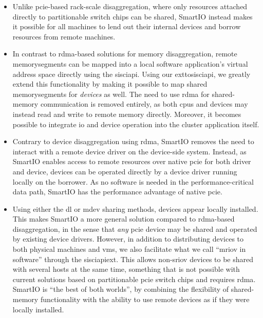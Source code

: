 \begin{itemize}
    \item Unlike \gls{pcie}-based rack-scale \gls{disaggregation}, where only resources attached directly to partitionable switch chips can be shared, SmartIO instead makes it possible for all machines to lend out their internal devices and borrow resources from remote machines.



    \item In contrast to \gls{rdma}-based solutions for memory \gls{disaggregation}, remote \glspl{memorysegment} can be mapped into a local software application's virtual address space directly using the \gls{sisciapi}.
        Using our \gls{exttosisciapi}, we greatly extend this functionality by making it possible to map shared \glspl{memorysegment} for \emph{devices} as well.
        The need to use \gls{rdma} for shared-memory communication is removed entirely, as both \glspl{cpu} and devices may instead read and write to remote memory directly.
        Moreover, it becomes possible to integrate \gls{io} and device operation into the cluster application itself.



    \item Contrary to device \gls{disaggregation} using \gls{rdma}, SmartIO removes the need to interact with a remote device driver on the device-side system.
        Instead, as SmartIO enables access to remote resources over native \gls{pcie} for both driver and device, devices can be operated directly by a device driver running locally on the \gls{borrower}.
        As no software is needed in the performance-critical data path, SmartIO has the performance advantage of native \gls{pcie}.


    \item Using either the \gls{dl} or \gls{mdev} sharing methods, devices appear locally installed.
        This makes SmartIO a more general solution compared to \gls{rdma}-based \gls{disaggregation}, in the sense that \emph{any} \gls{pcie} device may be shared and operated by existing device drivers.
        However, in addition to distributing devices to both physical machines and \glspl{vm}, we also facilitate what we call ``\gls{mriov} in software'' through the \gls{sisciapiext}.
        This allows non-\gls{sriov} devices to be shared with several hosts at the same time, something that is not possible with current solutions based on partitionable \gls{pcie} switch chips and requires \gls{rdma}.
        SmartIO is ``the best of both worlds'', by combining the flexibility of shared-memory functionality with the ability to use remote devices as if they were locally installed.




\end{itemize}
